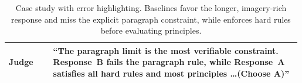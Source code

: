 \begin{table}[!t]
\begin{tabular}{@{}p{0.15\linewidth}p{0.84\linewidth}@{}}
\textbf{Judge} &
``The paragraph limit is the most verifiable constraint.  
Response~B \textcolor{green!70!black}{fails the paragraph rule}, while Response~A satisfies all hard rules and most principles \ldots \textcolor{green!70!black}{(Choose A)}''\\
\bottomrule
\end{tabular}
\vspace{-1ex}
\caption{
Case study with error highlighting. Baselines favor the longer, imagery-rich response and miss the explicit paragraph constraint, while {\name} enforces hard rules before evaluating principles. \vspace{-1ex}
}
\label{tab:case-chat-hard}
\endgroup
\end{table}

